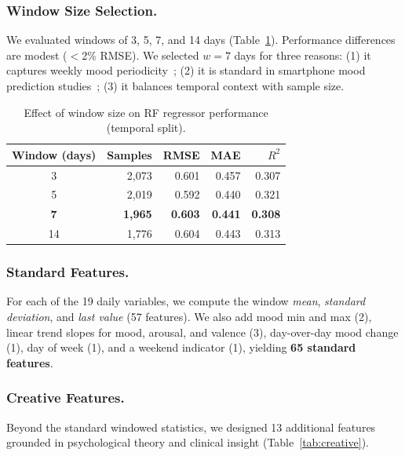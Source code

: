 \documentclass[runningheads]{llncs}
\begin{document}
\subsubsection{Window Size Selection.}

We evaluated windows of 3, 5, 7, and 14 days (Table~\ref{tab:window}). Performance differences are modest ($<$2\% RMSE). We selected $w = 7$ days for three reasons: (1) it captures weekly mood periodicity~\cite{golder2011}; (2) it is standard in smartphone mood prediction studies~\cite{likamwa2013, saeb2015}; (3) it balances temporal context with sample size.

\begin{table}[H]
\centering
\caption{Effect of window size on RF regressor performance (temporal split).}\label{tab:window}
\begin{tabular}{crrrr}
\toprule
Window (days) & Samples & RMSE & MAE & $R^2$ \\
\midrule
3  & 2,073 & 0.601 & 0.457 & 0.307 \\
5  & 2,019 & 0.592 & 0.440 & 0.321 \\
\textbf{7}  & \textbf{1,965} & \textbf{0.603} & \textbf{0.441} & \textbf{0.308} \\
14 & 1,776 & 0.604 & 0.443 & 0.313 \\
\bottomrule
\end{tabular}
\end{table}

\subsubsection{Standard Features.}

For each of the 19 daily variables, we compute the window \emph{mean}, \emph{standard deviation}, and \emph{last value} (57 features). We also add mood min and max (2), linear trend slopes for mood, arousal, and valence (3), day-over-day mood change (1), day of week (1), and a weekend indicator (1), yielding \textbf{65 standard features}.

\subsubsection{Creative Features.}

Beyond the standard windowed statistics, we designed 13 additional features grounded in psychological theory and clinical insight (Table~\ref{tab:creative}).
\end{document}
